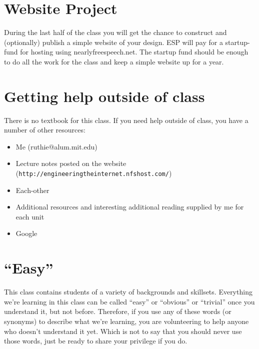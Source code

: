 \documentclass{article}
\begin{document}
\section{Website Project}
During the last half of the class you will get the chance to construct and (optionally) publish a simple website of your design.  ESP will pay for a startup-fund for hosting using nearlyfreespeech.net.  The startup fund should be enough to do all the work for the class and keep a simple website up for a year.

\section{Getting help outside of class}
There is no textbook for this class.  If you need help outside of class, you have a number of other resources:
\begin{itemize}
\item Me (ruthie@alum.mit.edu)
\item Lecture notes posted on the website (\texttt{http://engineeringtheinternet.nfshost.com/})
\item Each-other
\item Additional resources and interesting additional reading supplied by me for each unit
\item Google
\end{itemize}




\section{``Easy''}
This class contains students of a variety of backgrounds and skillsets.  Everything we're learning in this class can be called ``easy'' or ``obvious'' or ``trivial'' once you understand it, but not before.  Therefore, if you use any of these words (or synonyms) to describe what we're learning, you are volunteering to help anyone who doesn't understand it yet.  Which is not to say that you should never use those words, just be ready to share your privilege if you do.
\end{document}
